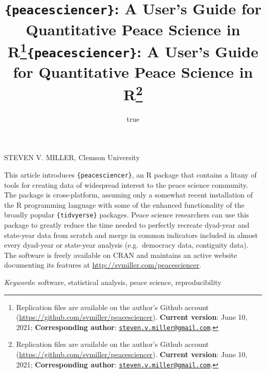 \documentclass[
  11pt,
]{article}
\title{\texttt{\{peacesciencer\}}: A User's Guide for Quantitative Peace Science in R\thanks{Replication files are available on the author's Github account (\url{https://github.com/svmiller/peacesciencer}). \textbf{Current version}: June 10, 2021; \textbf{Corresponding author}: \href{mailto:steven.v.miller@gmail.com}{\nolinkurl{steven.v.miller@gmail.com}}.}}
\author{true}
\date{}
\title{\texttt{\{peacesciencer\}}: A User's Guide for Quantitative Peace Science in R\thanks{Replication files are available on the author's Github account (\url{https://github.com/svmiller/peacesciencer}). \textbf{Current version}: June 10, 2021; \textbf{Corresponding author}: \href{mailto:steven.v.miller@gmail.com}{\nolinkurl{steven.v.miller@gmail.com}}.}  }
\date{}
\renewenvironment{abstract}
 {{%
    \setlength{\leftmargin}{0mm}
    \setlength{\rightmargin}{\leftmargin}%
  }%
  \relax}
 {\endlist}
\begin{document}



{%
\setlength{\parindent}{0pt}
\thispagestyle{plain}
{%
\maketitle  %

}




{
   \vskip 13.5pt\relax \normalsize\fontsize{11}{12}
   \MakeUppercase{Steven V. Miller}, \small{Clemson University}   

}

}








\begin{abstract}


    \vskip 8.5pt %

\noindent \small{This article introduces \texttt{\{peacesciencer\}}, an R package that contains a litany of tools for creating data of widespread interest to the peace science community. The package is cross-platform, assuming only a somewhat recent installation of the R programming language with some of the enhanced functionality of the broadly popular \texttt{\{tidvyerse\}} packages. Peace science researchers can use this package to greatly reduce the time needed to perfectly recreate dyad-year and state-year data from scratch and merge in common indicators included in almost every dyad-year or state-year analysis (e.g.~democracy data, contiguity data). The software is freely available on CRAN and maintains an active website documenting its features at \url{http://svmiller.com/peacesciencer}.}


\vskip 8.5pt \noindent \emph{Keywords}: software, statistical analysis, peace science, reproducibility \par




\end{abstract}
\end{document}
